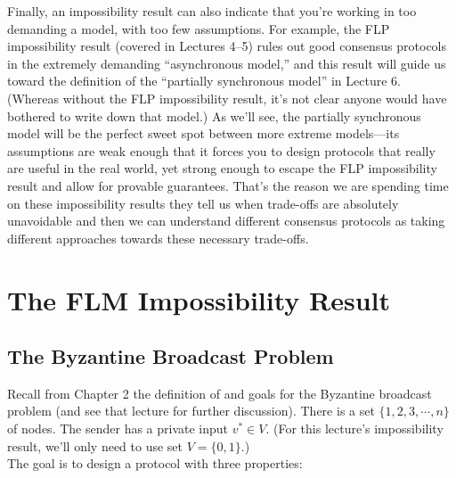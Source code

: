 Finally, an impossibility result can also indicate that you’re working in too demanding
a model, with too few assumptions. For example, the FLP impossibility result (covered in
Lectures 4–5) rules out good consensus protocols in the extremely demanding “asynchronous model,” and this result will guide us toward the definition of the “partially synchronous model” in Lecture 6. (Whereas without the FLP impossibility result, it’s not clear anyone
would have bothered to write down that model.) As we’ll see, the partially synchronous
model will be the perfect sweet spot between more extreme models—its assumptions are
weak enough that it forces you to design protocols that really are useful in the real world,
yet strong enough to escape the FLP impossibility result and allow for provable guarantees. That's the
reason we are spending time on these
impossibility results they
tell us when trade-offs are absolutely
unavoidable and then we can understand
different consensus protocols as taking
different approaches towards these necessary
trade-offs.



\section{The FLM Impossibility Result}
\subsection{The Byzantine Broadcast Problem}
Recall from Chapter 2 the definition of and goals for the Byzantine broadcast problem (and
see that lecture for further discussion). There is a set $\{1, 2, 3, \cdots, n\}$ of nodes.
The sender has a private input $v^* \in V$. (For this lecture’s impossibility result, we’ll only
need to use set $V = \{0, 1\}$.)\\
The goal is to design a protocol with three properties:\\

